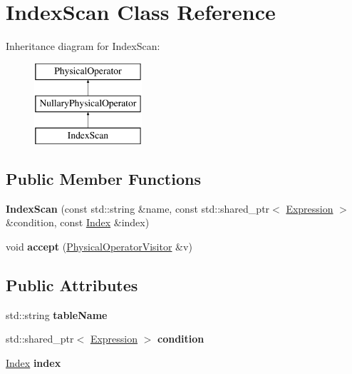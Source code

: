 \hypertarget{class_index_scan}{\section{Index\+Scan Class Reference}
\label{class_index_scan}
}
Inheritance diagram for Index\+Scan\+:\begin{figure}[H]
\begin{center}
\leavevmode
\includegraphics[height=3.000000cm]{class_index_scan}
\end{center}
\end{figure}
\subsection*{Public Member Functions}
\begin{DoxyCompactItemize}
\item 
\hypertarget{class_index_scan_a25eeb21a925a19209af7100de3f42ef5}{{\bfseries Index\+Scan} (const std\+::string \&name, const std\+::shared\+\_\+ptr$<$ \hyperlink{class_expression}{Expression} $>$ \&condition, const \hyperlink{class_index}{Index} \&index)}\label{class_index_scan_a25eeb21a925a19209af7100de3f42ef5}

\item 
\hypertarget{class_index_scan_a683950e9802678a2351f026ddb2a9881}{void {\bfseries accept} (\hyperlink{class_physical_operator_visitor}{Physical\+Operator\+Visitor} \&v)}\label{class_index_scan_a683950e9802678a2351f026ddb2a9881}

\end{DoxyCompactItemize}
\subsection*{Public Attributes}
\begin{DoxyCompactItemize}
\item 
\hypertarget{class_index_scan_a8557a6ffee853f05298881acf8bebe14}{std\+::string {\bfseries table\+Name}}\label{class_index_scan_a8557a6ffee853f05298881acf8bebe14}

\item 
\hypertarget{class_index_scan_a9adcd1af97f3df02679f18fed687af21}{std\+::shared\+\_\+ptr$<$ \hyperlink{class_expression}{Expression} $>$ {\bfseries condition}}\label{class_index_scan_a9adcd1af97f3df02679f18fed687af21}

\item 
\hypertarget{class_index_scan_a8ffc3e0a33fb2db655471ea28e47bc9e}{\hyperlink{class_index}{Index} {\bfseries index}}\label{class_index_scan_a8ffc3e0a33fb2db655471ea28e47bc9e}

\end{DoxyCompactItemize}


